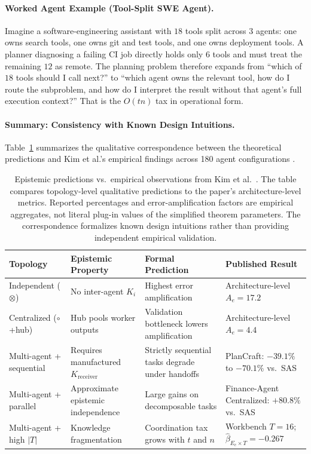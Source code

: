\paragraph{Worked Agent Example (Tool-Split SWE Agent).}
Imagine a software-engineering assistant with $18$ tools split across $3$ agents: one owns search tools, one owns git and test tools, and one owns deployment tools. A planner diagnosing a failing CI job directly holds only $6$ tools and must treat the remaining $12$ as remote. The planning problem therefore expands from ``which of $18$ tools should I call next?'' to ``which agent owns the relevant tool, how do I route the subproblem, and how do I interpret the result without that agent's full execution context?'' That is the $O(tn)$ tax in operational form.

\paragraph{Summary: Consistency with Known Design Intuitions.}
Table~\ref{tab:epistemic-predictions} summarizes the qualitative correspondence between the theoretical predictions and Kim et al.'s empirical findings across 180 agent configurations \cite{kim2025scaling}.

\begin{table}[h]
\centering
\small
\begin{tabular}{@{}p{}p{}p{}p{}@{}}
\toprule
\textbf{Topology} & \textbf{Epistemic Property} & \textbf{Formal Prediction} & \textbf{Published Result} \\
\midrule
Independent ($\otimes$) & No inter-agent $K_i$ & Highest error amplification & Architecture-level $A_e = 17.2$ \\
Centralized ($\circ$+hub) & Hub pools worker outputs & Validation bottleneck lowers amplification & Architecture-level $A_e = 4.4$ \\
Multi-agent + sequential & Requires manufactured $K_{\mathrm{receiver}}$ & Strictly sequential tasks degrade under handoffs & PlanCraft: $-39.1\%$ to $-70.1\%$ vs.\ SAS \\
Multi-agent + parallel & Approximate epistemic independence & Large gains on decomposable tasks & Finance-Agent Centralized: $+80.8\%$ vs.\ SAS \\
Multi-agent + high $|T|$ & Knowledge fragmentation & Coordination tax grows with $t$ and $n$ & Workbench $T=16$; $\hat{\beta}_{E_c \times T} = -0.267$ \\
\bottomrule
\end{tabular}
\caption{Epistemic predictions vs.\ empirical observations from Kim et al.~\cite{kim2025scaling}. The table compares topology-level qualitative predictions to the paper's architecture-level metrics. Reported percentages and error-amplification factors are empirical aggregates, not literal plug-in values of the simplified theorem parameters. The correspondence formalizes known design intuitions rather than providing independent empirical validation.}
\label{tab:epistemic-predictions}
\end{table}

